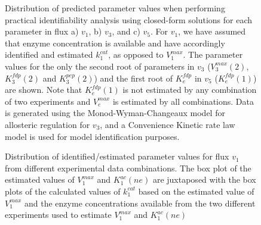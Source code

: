 \documentclass[10pt]{article}
\begin{document}
	\begin{figure}[!tbhp]
		\caption{Distribution of predicted parameter values when performing practical identifiability analysis using closed-form solutions for each parameter in flux a) $v_1$, b) $v_3$, and c) $v_5$. For $v_1$, we have assumed that enzyme concentration is available and have accordingly identified and estimated $k_1^{cat}$, as opposed to $V_1^{max}$. The parameter values for the only the second root of parameters in $v_3$ ($V_3^{max}(2)$, $K_3^{fdp}(2)$ and $K_3^{pep}(2)$) and the first root of $K_e^{fdp}$ in $v_5$ ($K_e^{fdp}(1)$) are shown. Note that $K_e^{fdp}(1)$ is not estimated by any combination of two experiments and $V_e^{max}$ is estimated by all combinations. Data is generated using the Monod-Wyman-Changeaux model for allosteric regulation for $v_3$, and a Convenience Kinetic rate law model is used for model identification purposes.}\label{fig:parameter_value_v1_kcat}
	\end{figure}	

	\begin{figure}[!tbhp]
		\caption{Distribution of identified/estimated parameter values for flux $v_1$ from different experimental data combinations. The box plot of the estimated values of $V_1^{max}$ and $K_1^{ac}(ne)$ are juxtaposed with the box plots of the calculated values of $k_1^{cat}$ based on the estimated value of $V_1^{max}$ and the enzyme concentrations available from the two different experiments used to estimate $V_1^{max}$ and $K_1^{ac}(ne)$}\label{fig:parameter_value_v1_v1max_kcat}
	\end{figure}	
	
\end{document}
